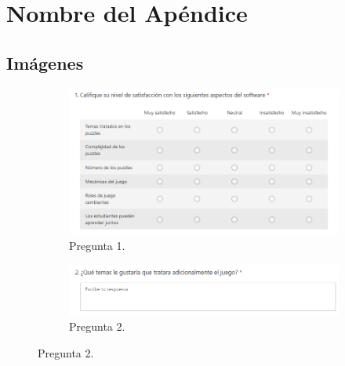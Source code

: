 \chapter{Nombre del Apéndice}\label{apendiceA}

\section{Imágenes}
\begin{figure}[H]
\centering
         \begin{subfigure}{0.8\textwidth}
         \centering
         \includegraphics[width=\textwidth]{images/PreguntaEncuesta (4).png}
         \caption{Pregunta 1.}
         \label{fig:survey1}
    \end{subfigure}

        \begin{subfigure}{0.8\textwidth}
         \centering
         \includegraphics[width=\textwidth]{images/PreguntaEncuesta (5).png}
         \caption{Pregunta 2.}
         \label{fig:survery2}
     \end{subfigure}
\end{figure}
